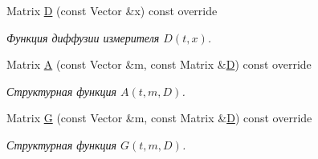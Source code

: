 \begin{DoxyCompactItemize}
Matrix \hyperlink{class_tasks_1_1_continuous_1_1_van_der_pol_linear_a07e8842a175006f214238a9f71e5ebdf}{D} (const Vector \&x) const override
\begin{DoxyCompactList}\small\item\em Функция диффузии измерителя $D(t,x)$. \end{DoxyCompactList}\item 
Matrix \hyperlink{class_tasks_1_1_continuous_1_1_van_der_pol_linear_a2eefb5fca01c3517c44d2683032fda9d}{A} (const Vector \&m, const Matrix \&\hyperlink{class_tasks_1_1_continuous_1_1_van_der_pol_linear_a07e8842a175006f214238a9f71e5ebdf}{D}) const override
\begin{DoxyCompactList}\small\item\em Структурная функция $A(t, m, D)$. \end{DoxyCompactList}\item 
Matrix \hyperlink{class_tasks_1_1_continuous_1_1_van_der_pol_linear_a931ba012a9671d8f522975232b48320f}{G} (const Vector \&m, const Matrix \&\hyperlink{class_tasks_1_1_continuous_1_1_van_der_pol_linear_a07e8842a175006f214238a9f71e5ebdf}{D}) const override
\begin{DoxyCompactList}\small\item\em Структурная функция $G(t, m, D)$. \end{DoxyCompactList}\end{DoxyCompactItemize}
